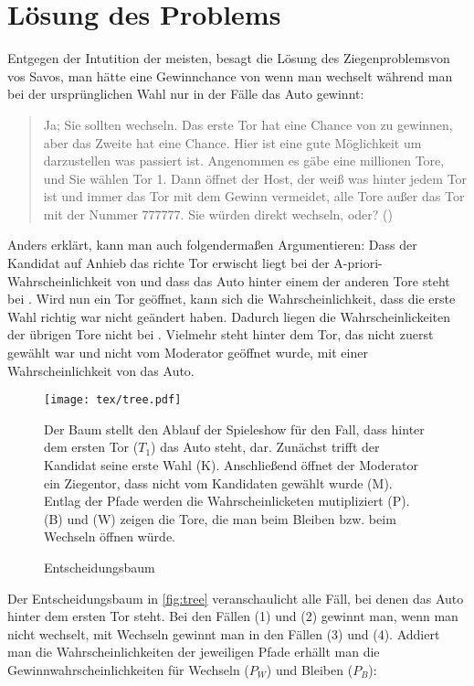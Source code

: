 \chapter{Lösung des Problems}

Entgegen der Intutition der meisten, besagt die Lösung des Ziegenproblemsvon vos Savos, man hätte eine Gewinnchance von  wenn man wechselt während man bei der ursprünglichen Wahl nur in  der Fälle das Auto gewinnt:

\begin{quote}
    Ja; Sie sollten wechseln. Das erste Tor hat eine Chance von  zu gewinnen, aber das Zweite hat eine  Chance. Hier ist eine gute Möglichkeit um darzustellen was passiert ist. Angenommen es gäbe eine millionen Tore, und Sie wählen Tor 1. Dann öffnet der Host, der weiß was hinter jedem Tor ist und immer das Tor mit dem Gewinn vermeidet, alle Tore außer das Tor mit der Nummer 777777. Sie würden direkt wechseln, oder? (\cite{Savant:1990})
\end{quote}

Anders erklärt, kann man auch folgendermaßen Argumentieren: Dass der Kandidat auf Anhieb das richte Tor erwischt liegt bei der A-priori-Wahrscheinlichkeit von  und dass das Auto hinter einem der anderen Tore steht bei . Wird nun ein Tor geöffnet, kann sich die Wahrscheinlichkeit, dass die erste Wahl richtig war nicht geändert haben. Dadurch liegen die Wahrscheinlickeiten der übrigen Tore nicht bei . Vielmehr steht hinter dem Tor, das nicht zuerst gewählt war und nicht vom Moderator geöffnet wurde, mit einer Wahrscheinlichkeit von  das Auto.

\begin{figure}[htbp]
    \centering
    \texttt{[image: tex/tree.pdf]}
    \caption{Entscheidungsbaum}\label{fig:tree}
    \small {Der Baum stellt den Ablauf der Spieleshow für den Fall, dass hinter dem ersten Tor ($T_1$) das Auto steht, dar. Zunächst trifft der Kandidat seine erste Wahl (K). Anschließend öffnet der Moderator ein Ziegentor, dass nicht vom Kandidaten gewählt wurde (M). Entlag der Pfade werden die Wahrscheinlicketen mutipliziert (P). (B) und (W) zeigen die Tore, die man beim Bleiben bzw. beim Wechseln öffnen würde.}
\end{figure}

Der Entscheidungsbaum in \autoref{fig:tree} veranschaulicht alle Fäll, bei denen das Auto hinter dem ersten Tor steht. Bei den Fällen (1) und (2) gewinnt man, wenn man nicht wechselt, mit Wechseln gewinnt man in den Fällen (3) und (4). Addiert man die Wahrscheinlichkeiten der jeweiligen Pfade erhällt man die Gewinnwahrscheinlichkeiten für Wechseln ($P_W$) und Bleiben ($P_B$):

